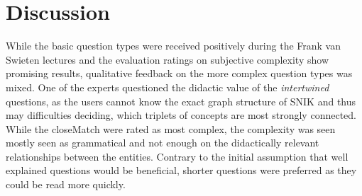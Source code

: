 \documentclass{IOS-Book-Article}     %
\begin{document}
\section{Discussion}
While the basic question types were received positively during the Frank van Swieten lectures and the evaluation ratings on subjective complexity show promising results, qualitative feedback on the more complex question types was mixed.
One of the experts questioned the didactic value of the \emph{intertwined} questions, as the users cannot know the exact graph structure of SNIK and thus may difficulties deciding, which triplets of concepts are most strongly connected.
While the closeMatch were rated as most complex, the complexity was seen mostly seen as grammatical and not enough on the didactically relevant relationships between the entities.
Contrary to the initial assumption that well explained questions would be beneficial, shorter questions were preferred as they could be read more quickly.


\end{document}
